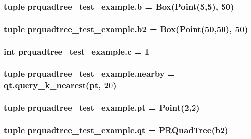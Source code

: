 \subsubsection[{b}]{\setlength{\rightskip}{0pt plus 5cm}tuple prquadtree\+\_\+test\+\_\+example.\+b = {\bf Box}({\bf Point}(5,5), 50)}\label{namespaceprquadtree__test__example_a430c6e4c1960cb0326d40a60be817d65}
\subsubsection[{b2}]{\setlength{\rightskip}{0pt plus 5cm}tuple prquadtree\+\_\+test\+\_\+example.\+b2 = {\bf Box}({\bf Point}(50,50), 50)}\label{namespaceprquadtree__test__example_a6c76891a5f566a70e8ab91c9946be5a2}
\subsubsection[{c}]{\setlength{\rightskip}{0pt plus 5cm}int prquadtree\+\_\+test\+\_\+example.\+c = 1}\label{namespaceprquadtree__test__example_a51f7199631c374c21ed3dada86cc3766}
\subsubsection[{nearby}]{\setlength{\rightskip}{0pt plus 5cm}tuple prquadtree\+\_\+test\+\_\+example.\+nearby = qt.\+query\+\_\+k\+\_\+nearest({\bf pt}, 20)}\label{namespaceprquadtree__test__example_a2024920106d8770dc2cfa9da1e4fe410}
\subsubsection[{pt}]{\setlength{\rightskip}{0pt plus 5cm}tuple prquadtree\+\_\+test\+\_\+example.\+pt = {\bf Point}(2,2)}\label{namespaceprquadtree__test__example_ab0091dbc0243fa027e0bc7025d8ea3ad}
\subsubsection[{qt}]{\setlength{\rightskip}{0pt plus 5cm}tuple prquadtree\+\_\+test\+\_\+example.\+qt = {\bf P\+R\+Quad\+Tree}({\bf b2})}\label{namespaceprquadtree__test__example_a92699a8bb92121b0ffdac66d511f3359}
